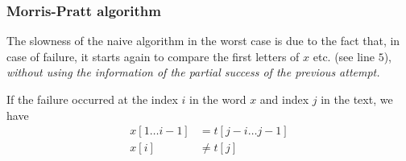 
%
\begin{frame}
\frametitle{Morris-Pratt algorithm}

The slowness of the naive algorithm in the worst case is due to the
fact that, in case of failure, it starts again to compare the first
letters of \(x\) etc. (see line \(5\)), \emph{without using the
  information of the partial success of the previous attempt.}

\bigskip

If the failure occurred at the index \(i\) in the word \(x\) and index
\(j\) in the text, we have
\begin{align*}
   x[1 \dots i-1]
&= t[j-i \dots j-1]\\
x[i] &\neq t[j]
\end{align*}

\end{frame}

%
\renewcommand\arraystretch{0.95}


